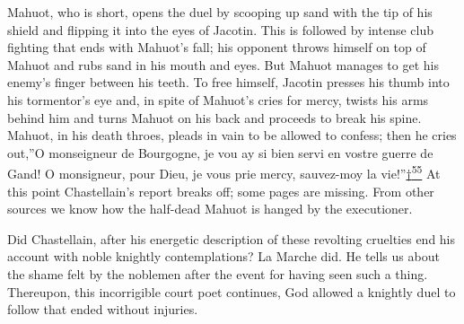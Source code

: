 Mahuot, who is short, opens the duel by scooping up sand with the tip of
his shield and flipping it into the eyes of Jacotin. This is followed by
intense club fighting that ends with Mahuot's fall; his opponent throws
himself on top of Mahuot and rubs sand in his mouth and eyes. But Mahuot
manages to get his enemy's finger between his teeth. To free himself,
Jacotin presses his thumb into his tormentor's eye and, in spite of
Mahuot's cries for mercy, twists his arms behind him and turns Mahuot on
his back and proceeds to break his spine. Mahuot, in his death throes,
pleads in vain to be allowed to confess; then he cries out,''O
monseigneur de Bourgogne, je vou ay si bien servi en vostre guerre de
Gand! O monsigneur, pour Dieu, je vous prie mercy, sauvez-moy la
vie!''\protect\hypertarget{10_Chapter_Three__THE_HEROIC_DREAM.xhtmlux5cux23id_2897}{\protect\hyperlink{23_NOTES.xhtmlux5cux23id_2898}{†\textsuperscript{55}}}
\protect\hypertarget{10_Chapter_Three__THE_HEROIC_DREAM.xhtmlux5cux23page_111}{}{}At
this point Chastellain's report breaks off; some pages are missing. From
other sources we know how the half-dead Mahuot is hanged by the
executioner.

Did Chastellain, after his energetic description of these revolting
cruelties end his account with noble knightly contemplations? La Marche
did. He tells us about the shame felt by the noblemen after the event
for having seen such a thing. Thereupon, this incorrigible court poet
continues, God allowed a knightly duel to follow that ended without
injuries.

